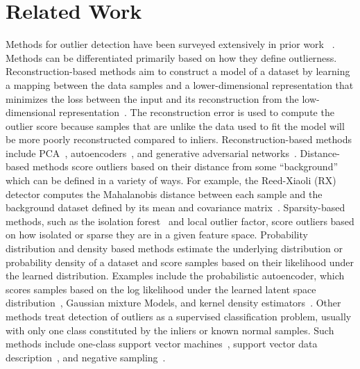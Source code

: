 \documentclass[letterpaper]{article} %
\begin{document}
\section{Related Work}
Methods for outlier detection have been 
surveyed extensively in prior work
~\cite{pimentel2014review,chandola2009anomaly,markou2003novelty,
markou2003novelty2}.
Methods can be differentiated primarily based on how they define outlierness.
%
Reconstruction-based methods aim to construct a model of a dataset by learning 
a mapping between the data samples and a lower-dimensional representation that
 minimizes the loss between the input and its reconstruction from the 
 low-dimensional representation~\citep{kerner2020comparison}. The 
 reconstruction error is used to compute the outlier score because samples
  that are unlike the data used to fit the model will be more poorly 
  reconstructed compared to inliers. Reconstruction-based methods
  include PCA~\cite{jablonski2015principal}, 
  autoencoders~\cite{richter2017safe,park2018multimodal}, and
  generative adversarial networks~\cite{akcay2018ganomaly}.
%
 Distance-based methods score outliers based on their distance from some
``background'' which can be defined in a variety of ways. For example,
the Reed-Xiaoli (RX) detector computes the 
Mahalanobis distance between each sample and the background dataset
defined by its mean and covariance matrix~\cite{reed1990adaptive}.
%
Sparsity-based methods, such as the isolation forest~\cite{liu2008isolation}
and local outlier factor\cite{breunig2000lof},
 score outliers based on how isolated or sparse they
are in a given feature space. 
%
Probability distribution and density based methods estimate the underlying 
distribution or probability density of a dataset and score samples based on
their likelihood under the learned distribution. Examples include the probabilistic
autoencoder, which scores samples based on the log likelihood under the learned
latent space distribution~\cite{bohm2020probabilistic}, Gaussian mixture 
Models, and kernel density estimators~\cite{chandola2009anomaly}. 
%
Other methods treat detection of outliers as a supervised classification 
problem, usually with only one class constituted by the inliers or 
known normal samples.
Such methods include one-class support vector 
machines~\cite{scholkopf1999support},
support vector data description~\cite{pimentel2014review},
and negative sampling~\cite{sipple:neg-sampling20}.
\end{document}
